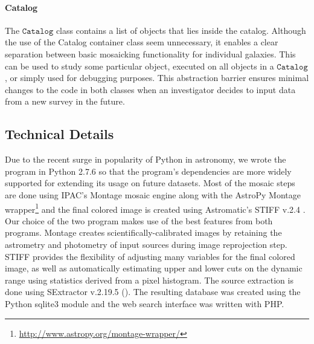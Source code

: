 \documentclass[5p]{elsarticle}
\begin{document}
	\paragraph{Catalog}
	The $\texttt{Catalog}$ class contains a list of objects that lies inside the catalog. Although the use of the Catalog container class seem unnecessary, it enables a clear separation between basic mosaicking functionality for individual galaxies. This can be used to study some particular object, executed on all objects in a $\texttt{Catalog}$, or simply used for debugging purposes. This abstraction barrier ensures minimal changes to the code in both classes when an investigator decides to input data from a new survey in the future.
		\subsection{Technical Details}
		Due to the recent surge in popularity of Python in astronomy, we wrote the program in Python 2.7.6 so that the program's dependencies are more widely supported for extending its usage on future datasets. Most of the mosaic steps are done using IPAC's Montage  \cite{montage} mosaic engine along with the AstroPy Montage wrapper\footnote{\url{http://www.astropy.org/montage-wrapper/}} and the final colored image is created using Astromatic's STIFF v.2.4 \cite{stiff}. Our choice of the two program makes use of the best features from both programs. Montage creates scientifically-calibrated images by retaining the astrometry and photometry of input sources during image reprojection step. STIFF provides the flexibility of adjusting many variables for the final colored image, as well as automatically estimating upper and lower cuts on the dynamic range using statistics derived from a pixel histogram.  %
The source extraction is done using SExtractor v.2.19.5 (\citet{sextractor}). The resulting database was created using the Python sqlite3 module and the web search interface was written with PHP.
\end{document}

